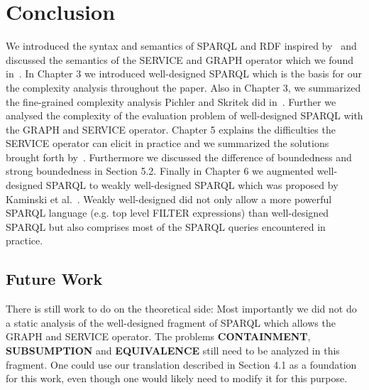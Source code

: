 \documentclass[draft,final]{vutinfth} %
\begin{document}
\chapter{Conclusion}
We introduced the syntax and semantics of SPARQL and RDF inspired
by~\cite{pichler2014containment,perez2009semantics,BuilAranda20131} and discussed
the semantics of the SERVICE and GRAPH operator which we found
in~\cite{BuilAranda20131}. In Chapter 3 we introduced well-designed SPARQL which
is the basis for our the complexity analysis throughout the paper. Also in Chapter 3, we summarized the fine-grained complexity analysis
Pichler and Skritek did in~\cite{pichler2014containment}. Further we analysed the
complexity of the evaluation problem of well-designed  SPARQL with the GRAPH and
SERVICE operator. Chapter 5 explains the difficulties the SERVICE operator can elicit in
practice and we summarized the solutions brought forth
by~\cite{BuilAranda20131}. Furthermore we discussed the difference of boundedness and
strong boundedness in Section 5.2. Finally in Chapter 6 we augmented well-designed
SPARQL to weakly well-designed SPARQL which was proposed by Kaminski et
al.~\cite{kaminski_bwd}. Weakly well-designed did not only allow a more powerful
SPARQL language (e.g. top level FILTER expressions) than well-designed SPARQL but also comprises most of the SPARQL
queries encountered in practice.

\section{Future Work}
There is still work to do on the theoretical side:
Most importantly we did not do a static analysis of the well-designed fragment of SPARQL
which allows the GRAPH and SERVICE operator. The problems \textbf{CONTAINMENT},
\textbf{SUBSUMPTION} and \textbf{EQUIVALENCE} still need to be analyzed in this
fragment. One could use our translation described in Section 4.1 as a foundation
for this work, even though one would likely need to modify it for this purpose.
\backmatter

\listoffigures %

\listoftables %

\listofalgorithms
{}

\printindex

\printglossaries



\end{document}
